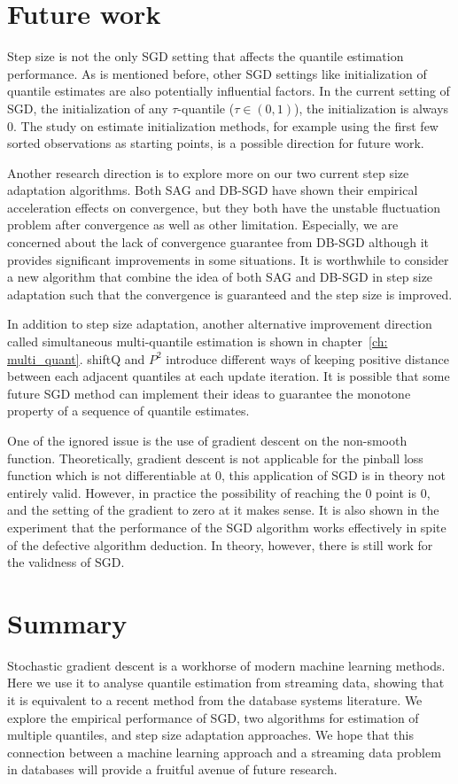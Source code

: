 \section{Future work}

Step size is not the only SGD setting that affects the quantile estimation performance. As is mentioned before, other SGD settings like initialization of quantile estimates are also potentially influential factors. In the current setting of SGD, the initialization of any $\tau$-quantile ($\tau \in (0,1)$), the initialization is always $0$. The study on estimate initialization methods, for example using the first few sorted observations as starting points, is a possible direction for future work.

Another research direction is to explore more on our two current step size adaptation algorithms. Both SAG and DB-SGD have shown their empirical acceleration effects on convergence, but they both have the unstable fluctuation problem after convergence as well as other limitation. Especially, we are concerned about the lack of convergence guarantee from DB-SGD although it provides significant improvements in some situations. It is worthwhile to consider a new algorithm that combine the idea of both SAG and DB-SGD in step size adaptation such that the convergence is guaranteed and the step size is improved.

In addition to step size adaptation, another alternative improvement direction called simultaneous multi-quantile estimation is shown in chapter~\ref{ch: multi_quant}. 
shiftQ and $P^2$ introduce different ways of keeping positive distance between each adjacent quantiles at each update iteration. It is possible that some future SGD method can implement their ideas to guarantee the monotone property of a sequence of quantile estimates.

One of the ignored issue is the use of gradient descent on the non-smooth function. Theoretically, gradient descent is not applicable for the pinball loss function which is not differentiable at $0$, this application of SGD is in theory not entirely valid. However, in practice the possibility of reaching the $0$ point is $0$, and the setting of the gradient to zero at it makes sense. It is also shown in the experiment that the performance of the SGD algorithm works effectively in spite of the defective algorithm deduction. In theory, however, there is still work for the validness of SGD.



\section{Summary}
Stochastic gradient descent is a workhorse of modern machine learning methods. Here we use it to analyse quantile estimation from streaming data, showing that it is equivalent to a recent method from the database systems literature. We explore the empirical performance of SGD, two algorithms for estimation of multiple quantiles, and step size adaptation approaches. We hope that this connection between a machine learning approach and a streaming data problem in databases will provide a fruitful avenue of future research.